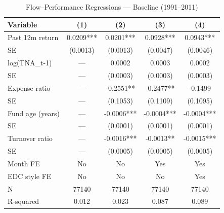 \begin{table}[htbp]
\centering
\caption{Flow--Performance Regressions --- Baseline (1991--2011)}
\label{tab:regression_baseline}
\small
\begin{tabular}{lcccc}
\toprule
Variable & (1) & (2) & (3) & (4) \\
\midrule
Past 12m return & 0.0209*** & 0.0201*** & 0.0928*** & 0.0943*** \\
SE & (0.0013) & (0.0013) & (0.0047) & (0.0046) \\
log(TNA\_t-1) & — & 0.0002 & 0.0003 & 0.0002 \\
SE & — & (0.0003) & (0.0003) & (0.0003) \\
Expense ratio & — & -0.2551** & -0.2477** & -0.1499 \\
SE & — & (0.1053) & (0.1109) & (0.1095) \\
Fund age (years) & — & -0.0006*** & -0.0004*** & -0.0004*** \\
SE & — & (0.0001) & (0.0001) & (0.0001) \\
Turnover ratio & — & -0.0016*** & -0.0013** & -0.0015*** \\
SE & — & (0.0005) & (0.0005) & (0.0005) \\
Month FE & No & No & Yes & Yes \\
EDC style FE & No & No & No & Yes \\
N & 77140 & 77140 & 77140 & 77140 \\
R-squared & 0.012 & 0.023 & 0.087 & 0.089 \\
\bottomrule
\end{tabular}
\end{table}
